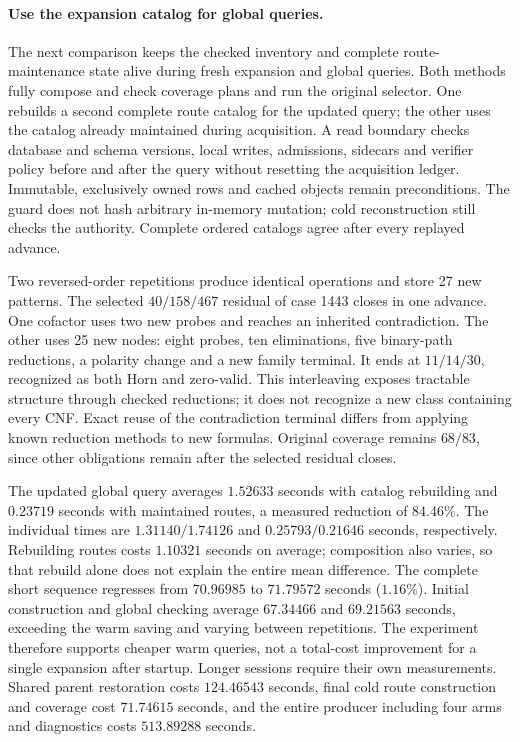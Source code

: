 \documentclass[11pt,a4paper]{article}
\numberwithin{equation}{section}
\theoremstyle{plain}
\theoremstyle{definition}
\theoremstyle{remark}
\begin{document}
\paragraph{Use the expansion catalog for global queries.}
The next comparison keeps the checked inventory and complete route-maintenance
state alive during fresh expansion and global queries. Both methods fully
compose and check coverage plans and run the original selector. One rebuilds
a second complete route catalog for the updated query; the other uses the
catalog already maintained during acquisition. A read boundary checks database
and schema versions, local writes, admissions, sidecars and verifier policy
before and after the query without resetting the acquisition ledger. Immutable,
exclusively owned rows and cached objects remain preconditions. The guard does
not hash arbitrary in-memory mutation; cold reconstruction still checks the
authority. Complete ordered catalogs agree after every replayed advance.

Two reversed-order repetitions produce identical operations and store 27 new
patterns. The selected $40/158/467$ residual of case 1443 closes in one advance.
One cofactor uses two new probes and reaches an inherited contradiction. The
other uses 25 new nodes: eight probes, ten eliminations, five binary-path
reductions, a polarity change and a new family terminal. It ends at $11/14/30$,
recognized as both Horn and zero-valid. This interleaving exposes tractable
structure through checked reductions; it does not recognize a new class
containing every CNF. Exact reuse of the contradiction terminal differs from
applying known reduction methods to new formulas. Original coverage remains
$68/83$, since other obligations remain after the selected residual closes.

The updated global query averages $1.52633$ seconds with catalog rebuilding and
$0.23719$ seconds with maintained routes, a measured reduction of $84.46\%$.
The individual times are $1.31140/1.74126$ and $0.25793/0.21646$ seconds,
respectively. Rebuilding routes costs $1.10321$ seconds on average; composition
also varies, so that rebuild alone does not explain the entire mean difference.
The complete short sequence regresses from $70.96985$ to $71.79572$ seconds
($1.16\%$). Initial construction and global checking average $67.34466$ and
$69.21563$ seconds, exceeding the warm saving and varying between repetitions.
The experiment therefore supports cheaper warm queries, not a total-cost
improvement for a single expansion after startup. Longer sessions require their
own measurements. Shared parent restoration costs $124.46543$ seconds, final
cold route construction and coverage cost $71.74615$ seconds, and the entire
producer including four arms and diagnostics costs $513.89288$ seconds.
\end{document}
